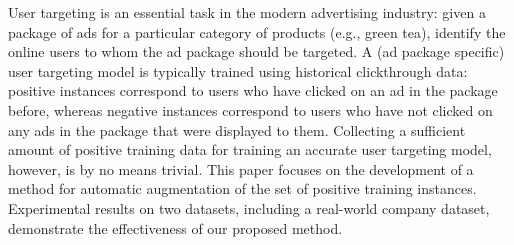 User targeting is an essential task in the modern advertising industry: given a package of ads for a particular category of products (e.g., green tea), identify the online users to whom the ad package should be targeted. A (ad package specific) user targeting model is typically trained using historical clickthrough data: positive instances correspond to users who have clicked on an ad in the package before, whereas negative instances correspond to users who have not clicked on any ads in the package that were displayed to them. Collecting a sufficient amount of positive training data for training an accurate user targeting model, however, is by no means trivial. This paper focuses on the development of a method for automatic augmentation of the set of positive training instances. Experimental results on two datasets, including a real-world company dataset, demonstrate the effectiveness of our proposed method.
